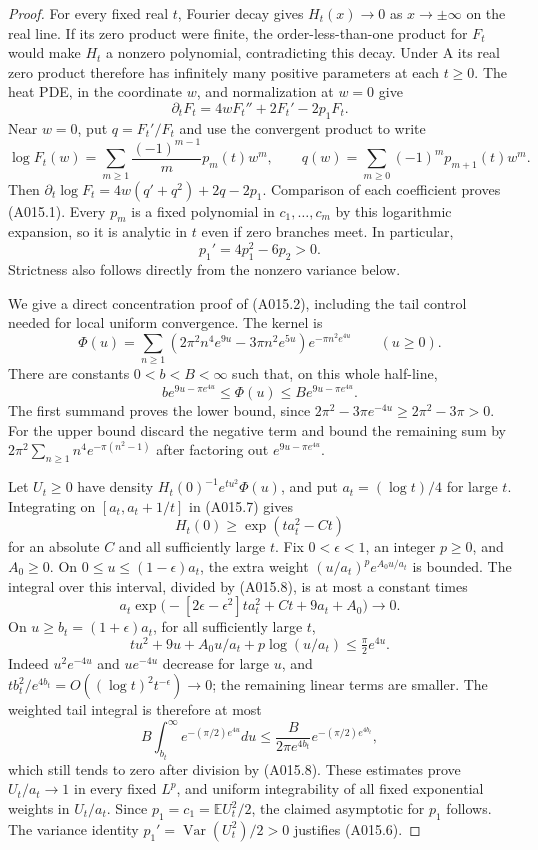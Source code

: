 \begin{proof}
For every fixed real $t$, Fourier decay gives $H_t(x)\to0$ as
$x\to\pm\infty$ on the real line. If its zero product were finite,
the order-less-than-one product for $F_t$ would make $H_t$ a nonzero
polynomial, contradicting this decay. Under A its real zero product
therefore has infinitely many positive parameters at each $t\ge0$.
The heat PDE, in the coordinate $w$, and normalization at $w=0$ give
\[
 \partial_tF_t=4wF_t''+2F_t'-2p_1F_t.
\]
Near $w=0$, put $q=F_t'/F_t$ and use the convergent product to write
\[
 \log F_t(w)=\sum_{m\ge1}\frac{(-1)^{m-1}}m p_m(t)w^m,
 \qquad q(w)=\sum_{m\ge0}(-1)^m p_{m+1}(t)w^m.
\]
Then $\partial_t\log F_t=4w(q'+q^2)+2q-2p_1$.
Comparison of each coefficient proves (A015.1). Every $p_m$ is a
fixed polynomial in $c_1,\ldots,c_m$ by this logarithmic expansion,
so it is analytic in $t$ even if zero branches meet. In particular,
\[
 p_1'=4p_1^2-6p_2>0.                                  \tag{A015.6}
\]
Strictness also follows directly from the nonzero variance below.

We give a direct concentration proof of (A015.2), including the
tail control needed for local uniform convergence. The kernel is
\[
 \Phi(u)=\sum_{n\ge1}
 (2\pi^2n^4e^{9u}-3\pi n^2e^{5u})e^{-\pi n^2e^{4u}}
 \qquad(u\ge0).
\]
There are constants $0<b<B<\infty$ such that, on this whole half-line,
\[
 b e^{9u-\pi e^{4u}}\le\Phi(u)
       \le B e^{9u-\pi e^{4u}}.                        \tag{A015.7}
\]
The first summand proves the lower bound, since
$2\pi^2-3\pi e^{-4u}\ge2\pi^2-3\pi>0$.
For the upper bound discard the negative term and bound the remaining
sum by $2\pi^2\sum_{n\ge1}n^4e^{-\pi(n^2-1)}$ after factoring
out $e^{9u-\pi e^{4u}}$.

Let $U_t\ge0$ have density $H_t(0)^{-1}e^{tu^2}\Phi(u)$, and put
$a_t=(\log t)/4$ for large $t$. Integrating on
$[a_t,a_t+1/t]$ in (A015.7) gives
\[
 H_t(0)\ge\exp(t a_t^2-Ct)                            \tag{A015.8}
\]
for an absolute $C$ and all sufficiently large $t$.
Fix $0<\epsilon<1$, an integer $p\ge0$, and $A_0\ge0$.
On $0\le u\le(1-\epsilon)a_t$, the extra weight
$(u/a_t)^p e^{A_0u/a_t}$ is bounded. The integral over this interval,
divided by (A015.8), is at most a constant times
\[
 a_t\exp\bigl(-[2\epsilon-\epsilon^2]t a_t^2
                         +Ct+9a_t+A_0\bigr)\longrightarrow0.
\]
On $u\ge b_t=(1+\epsilon)a_t$, for all sufficiently large $t$,
\[
 tu^2+9u+A_0u/a_t+p\log(u/a_t)\le\tfrac\pi2e^{4u}.
\]
Indeed $u^2e^{-4u}$ and $ue^{-4u}$ decrease for large $u$, and
$t b_t^2/e^{4b_t}=O((\log t)^2t^{-\epsilon})\to0$;
the remaining linear terms are smaller. The weighted tail integral
is therefore at most
\[
 B\int_{b_t}^\infty e^{-(\pi/2)e^{4u}}du
 \le \frac{B}{2\pi e^{4b_t}}
                 e^{-(\pi/2)e^{4b_t}},
\]
which still tends to zero after division by (A015.8).
These estimates prove $U_t/a_t\to1$ in every fixed $L^p$, and
uniform integrability of all fixed exponential weights in $U_t/a_t$.
Since $p_1=c_1=\mathbb E U_t^2/2$, the claimed asymptotic for $p_1$
follows. The variance identity
$p_1'=\operatorname{Var}(U_t^2)/2>0$ justifies (A015.6).


\end{proof}
